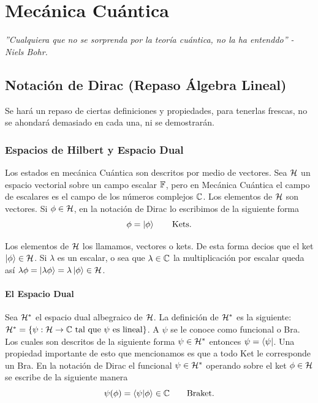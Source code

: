 \part{Mecánica Cuántica}

\vspace*{\fill}

\begin{center}
	\textit{''Cualquiera que no se sorprenda por la teoría cuántica, no la ha entenddo'' - Niels Bohr.}
\end{center}

\vspace*{\fill}


\chapter{Notación de Dirac (Repaso Álgebra Lineal)}

Se hará un repaso de ciertas definiciones y propiedades, para tenerlas frescas, no se ahondará demasiado en cada una, ni se demostrarán. \\


\section{Espacios de Hilbert y Espacio Dual}
Los estados en mecánica Cuántica son descritos por medio de vectores. Sea $\mathcal{H}$ un espacio vectorial sobre un campo escalar $\mathbb{F}$, pero en Mecánica Cuántica el campo de escalares es el campo de los números complejos $\mathbb{C}$. Los elementos de $\mathcal{H}$ son vectores. Si $\phi \in \mathcal{H}$, en la notación de Dirac lo escribimos de la siguiente forma
	$$ \phi = \ket{\phi} \qquad \text{Kets}. $$
	
Los elementos de $\mathcal{H}$ los llamamos, vectores o kets. De esta forma decios que el ket $\ket{\phi} \in \mathcal{H}$. Si $\lambda$ es un escalar, o sea que $\lambda \in \mathbb{C}$ la multiplicación por escalar queda así $\lambda \phi = \ket{\lambda \phi} = \lambda \ket{\phi} \in \mathcal{H}$.

\subsection{El Espacio Dual}
Sea $\mathcal{H} ^*$ el espacio dual albegraico de $\mathcal{H}$. La definición de $\mathcal{H} ^*$ es la siguiente: $\mathcal{H} ^* = \{ \psi : \mathcal{H} \to \mathbb{C} \text{ tal que } \psi \text{ es lineal} \}$. A $\psi$ se le conoce como funcional o Bra. Los cuales son descritos de la siguiente forma $\psi \in \mathcal{H} ^*$ entonces $\psi = \bra{\psi}$. Una propiedad importante de esto que mencionamos es que a todo Ket le corresponde un Bra. En la notación de Dirac el funcional $\psi \in \mathcal{H} ^*$ operando sobre el ket $\phi \in \mathcal{H}$ se escribe de la siguiente manera
	$$ \psi (\phi) = \braket{\psi}{\phi} \in \mathbb{C} \qquad \text{Braket}. $$

